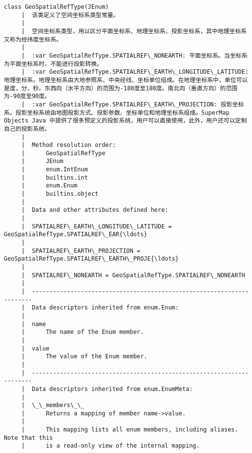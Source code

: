 \documentclass[11pt]{article}
\begin{document}
\begin{Verbatim}[commandchars=\\\{\}]
    class GeoSpatialRefType(JEnum)
     |  该类定义了空间坐标系类型常量。
     |  
     |  空间坐标系类型，用以区分平面坐标系、地理坐标系、投影坐标系，其中地理坐标系又称为经纬度坐标系。
     |  
     |  :var GeoSpatialRefType.SPATIALREF\_NONEARTH: 平面坐标系。当坐标系为平面坐标系时，不能进行投影转换。
     |  :var GeoSpatialRefType.SPATIALREF\_EARTH\_LONGITUDE\_LATITUDE: 地理坐标系。地理坐标系由大地参照系、中央经线、坐标单位组成。在地理坐标系中，单位可以是度，分，秒。东西向（水平方向）的范围为-180度至180度。南北向（垂直方向）的范围为-90度至90度。
     |  :var GeoSpatialRefType.SPATIALREF\_EARTH\_PROJECTION: 投影坐标系。投影坐标系统由地图投影方式、投影参数、坐标单位和地理坐标系组成。SuperMap Objects Java 中提供了很多预定义的投影系统，用户可以直接使用，此外，用户还可以定制自己的投影系统。
     |  
     |  Method resolution order:
     |      GeoSpatialRefType
     |      JEnum
     |      enum.IntEnum
     |      builtins.int
     |      enum.Enum
     |      builtins.object
     |  
     |  Data and other attributes defined here:
     |  
     |  SPATIALREF\_EARTH\_LONGITUDE\_LATITUDE = GeoSpatialRefType.SPATIALREF\_EAR{\ldots}
     |  
     |  SPATIALREF\_EARTH\_PROJECTION = GeoSpatialRefType.SPATIALREF\_EARTH\_PROJE{\ldots}
     |  
     |  SPATIALREF\_NONEARTH = GeoSpatialRefType.SPATIALREF\_NONEARTH
     |  
     |  ----------------------------------------------------------------------
     |  Data descriptors inherited from enum.Enum:
     |  
     |  name
     |      The name of the Enum member.
     |  
     |  value
     |      The value of the Enum member.
     |  
     |  ----------------------------------------------------------------------
     |  Data descriptors inherited from enum.EnumMeta:
     |  
     |  \_\_members\_\_
     |      Returns a mapping of member name->value.
     |      
     |      This mapping lists all enum members, including aliases. Note that this
     |      is a read-only view of the internal mapping.
    

\end{Verbatim}
\end{document}
